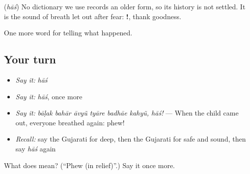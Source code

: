 \begin{cousinweb}
\textbf{} (\emph{hāś}) No dictionary we use records an older form, so its history is not settled. It is the sound of breath let out after fear: \textbf{!}, thank goodness.
\end{cousinweb}

\begin{grammarlens}[title={What you've built}]
One more word for telling what happened.
\end{grammarlens}

\subsection*{Your turn}
\begin{itemize}
\raggedright
  \item \emph{Say it:} \emph{hāś}
  \item \emph{Say it:} \emph{hāś}, once more
  \item \emph{Say it:} \emph{bāḷak bahār āvyũ tyāre badhāe kahyũ, hāś!} — When the child came out, everyone breathed again: phew!
  \item \emph{Recall:} say the Gujarati for deep, then the Gujarati for safe and sound, then say \emph{hāś} again
\end{itemize}

\begin{tcolorbox}[breakable,colback=teal!4,colframe=teal!35!black,title={Before you move on}]
What does  mean? (\textquotedblleft{}Phew (in relief)\textquotedblright{}.) Say it once more.
\end{tcolorbox}
